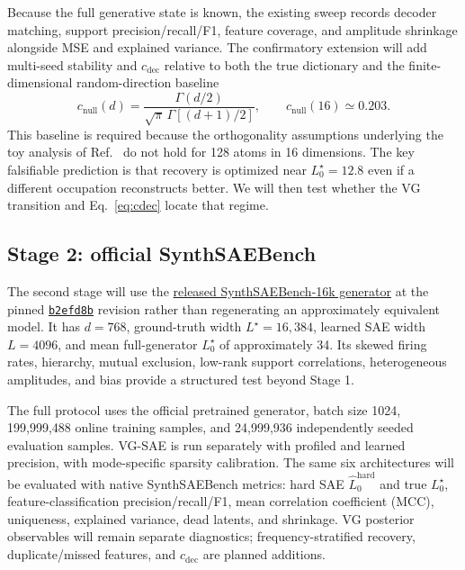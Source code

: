 \documentclass[aps,pre,reprint,superscriptaddress,amsmath,amssymb,nofootinbib]{revtex4-2}
\begin{document}
Because the full generative state is known, the existing sweep records decoder
matching, support precision/recall/F1, feature coverage, and amplitude
shrinkage alongside MSE and explained variance.  The confirmatory extension
will add multi-seed stability and $c_{\mathrm{dec}}$ relative to both the true
dictionary and the finite-dimensional random-direction baseline
\begin{equation}
 c_{\mathrm{null}}(d)=
 \frac{\Gamma(d/2)}{\sqrt{\pi}\,\Gamma[(d+1)/2]},
 \qquad c_{\mathrm{null}}(16)\simeq0.203.
\end{equation}
This baseline is required because the orthogonality assumptions underlying the
toy analysis of Ref.~\cite{chanin2026sparse} do not hold for 128
atoms in 16 dimensions.  The key falsifiable prediction is that recovery is
optimized near $L_0^\star=12.8$ even if a different occupation reconstructs
better.  We will then test whether the VG transition and
Eq.~\eqref{eq:cdec} locate that regime.

\subsection{Stage 2: official SynthSAEBench}

The second stage will use the
\href{https://huggingface.co/decoderesearch/synth-sae-bench-16k-v1}{released
SynthSAEBench-16k generator} at the pinned
\href{https://huggingface.co/decoderesearch/synth-sae-bench-16k-v1/tree/b2efd8b919ae46d6d487c73d46db5ee52813621d}{\texttt{b2efd8b}}
revision rather than regenerating an approximately equivalent model.  It has
$d=768$, ground-truth width $L^\star=16{,}384$, learned SAE width $L=4096$,
and mean full-generator
$L_0^\star$ of approximately 34.  Its skewed firing rates, hierarchy, mutual
exclusion, low-rank support correlations, heterogeneous amplitudes, and bias
provide a structured test beyond Stage 1.

The full protocol uses the official pretrained generator, batch size 1024,
199,999,488 online training samples, and 24,999,936 independently seeded
evaluation samples.  VG-SAE is run separately with profiled and learned
precision, with mode-specific sparsity calibration.
The same six architectures will be evaluated with native SynthSAEBench metrics:
hard SAE $\widehat L_0^{\mathrm{hard}}$ and true $L_0^\star$,
feature-classification
precision/recall/F1, mean correlation coefficient (MCC), uniqueness,
explained variance, dead latents, and shrinkage.  VG
posterior observables will remain separate diagnostics; frequency-stratified recovery,
duplicate/missed features, and $c_{\mathrm{dec}}$ are planned additions.
\end{document}

